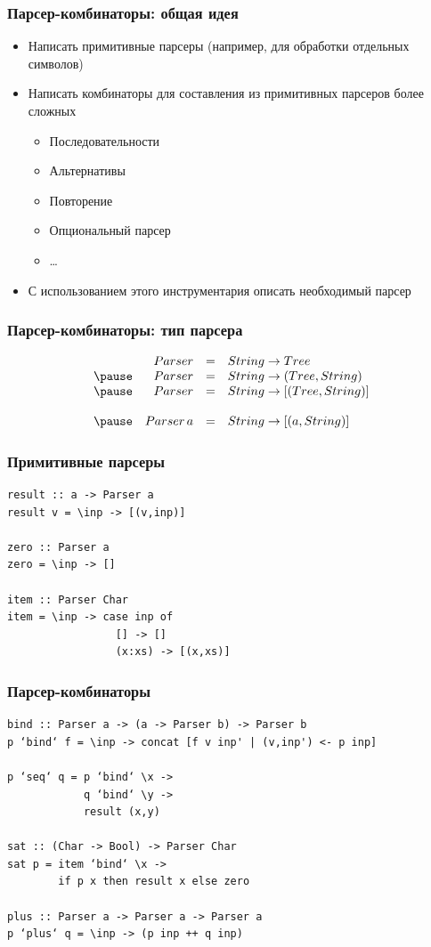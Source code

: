 \documentclass{beamer}
\begin{document}
\begin{frame}[fragile]
  \transwipe[direction=90]
  \frametitle{Парсер-комбинаторы: общая идея}
  \begin{itemize}
    \item Написать примитивные парсеры (например, для обработки отдельных 
символов)
    \item Написать комбинаторы для составления из примитивных парсеров более 
сложных
    \begin{itemize}
      \item Последовательности
      \item Альтернативы
      \item Повторение
      \item Опциональный парсер
      \item \dots
    \end{itemize}
    \item С использованием этого инструментария описать необходимый парсер
  \end{itemize}
\end{frame}

\begin{frame}
  \transwipe[direction=90]
  \frametitle{Парсер-комбинаторы: тип парсера}
$$
\begin{array}{crcl}
&Parser & = & String \rightarrow Tree \\ \pause
&Parser & = & String \rightarrow (Tree, String) \\ \pause
&Parser & = & String \rightarrow [(Tree, String)] \\ \\ \pause
&Parser \, a & = & String \rightarrow [(a, String)]
\end{array}
$$
\end{frame}

\begin{frame}[fragile]
  \transwipe[direction=90]
  \frametitle{Примитивные парсеры}
\begin{verbatim}
result :: a -> Parser a
result v = \inp -> [(v,inp)]

zero :: Parser a
zero = \inp -> []

item :: Parser Char
item = \inp -> case inp of
                 [] -> []
                 (x:xs) -> [(x,xs)]
\end{verbatim}  
\end{frame}

\begin{frame}[fragile]
  \transwipe[direction=90]
  \frametitle{Парсер-комбинаторы}
\begin{verbatim}
bind :: Parser a -> (a -> Parser b) -> Parser b
p ‘bind‘ f = \inp -> concat [f v inp' | (v,inp') <- p inp]

p ‘seq‘ q = p ‘bind‘ \x ->
            q ‘bind‘ \y ->
            result (x,y)

sat :: (Char -> Bool) -> Parser Char
sat p = item ‘bind‘ \x ->
        if p x then result x else zero

plus :: Parser a -> Parser a -> Parser a
p ‘plus‘ q = \inp -> (p inp ++ q inp)
\end{verbatim}
\end{frame}
\end{document}
